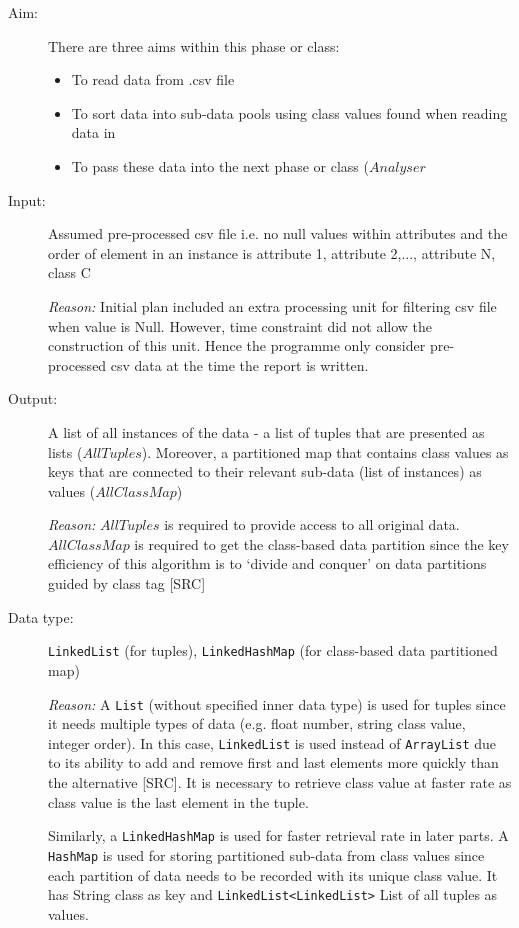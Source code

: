 \begin{description}

\item[Aim: ] There are three aims within this phase or class:
\begin{itemize}
	\item{To read data from .csv file} 
	\item{To sort data into sub-data pools using class values found when reading data in} 
	\item{To pass these data into the next phase or class ($Analyser$} 
\end{itemize}

\item[Input: ] Assumed pre-processed csv file i.e. no null values within attributes and the order of element in an instance is {attribute 1, attribute 2,..., attribute N, class C}

\textit{Reason: } Initial plan included an extra processing unit for filtering csv file when value is Null. However, time constraint did not allow the construction of this unit. Hence the programme only consider pre-processed csv data at the time the report is written.

\item[Output: ] A list of all instances of the data - a list of tuples that are presented as lists ($AllTuples$). Moreover, a partitioned map that contains class values as keys that are connected to their relevant sub-data (list of instances) as values ($AllClassMap$)
  
\textit{Reason: } $AllTuples$ is required to provide access to all original data. $AllClassMap$ is required to get the class-based data partition since the key efficiency of this algorithm is to `divide and conquer' on data partitions guided by class tag [SRC]

\item[Data type: ] \texttt{LinkedList} (for tuples), \texttt{LinkedHashMap} (for class-based data partitioned map)

\textit{Reason: } A \texttt{List} (without specified inner data type) is used for tuples since it needs multiple types of data (e.g. float number, string class value, integer order). In this case, \texttt{LinkedList} is used instead of \texttt{ArrayList} due to its ability to add and remove first and last elements more quickly than the alternative [SRC]. It is necessary to retrieve class value at faster rate as class value is the last element in the tuple.

Similarly, a \texttt{LinkedHashMap} is used for faster retrieval rate in later parts. A \texttt{HashMap} is used for storing partitioned sub-data from class values since each partition of data needs to be recorded with its unique class value. It has String class as key and \texttt{LinkedList<LinkedList>} List of all tuples as values. 


\end{description}
